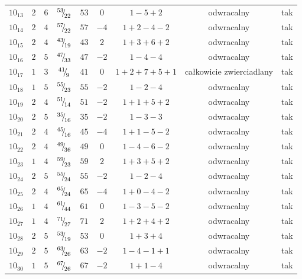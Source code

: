 \begin{longtable}{ccccccccc}
$10_{13}$ & $2$ & $6$ & ${}^{53}{\mskip -5mu/\mskip -3mu}_{22}$ & $53$ & $0$ & $1-5+2$ & odwracalny & tak \\
$10_{14}$ & $2$ & $4$ & ${}^{57}{\mskip -5mu/\mskip -3mu}_{22}$ & $57$ & $-4$ & $1+2-4-2$ & odwracalny & tak \\
$10_{15}$ & $2$ & $4$ & ${}^{43}{\mskip -5mu/\mskip -3mu}_{19}$ & $43$ & $2$ & $1+3+6+2$ & odwracalny & tak \\
$10_{16}$ & $2$ & $5$ & ${}^{47}{\mskip -5mu/\mskip -3mu}_{33}$ & $47$ & $-2$ & $1-4-4$ & odwracalny & tak \\
$10_{17}$ & $1$ & $3$ & ${}^{41}{\mskip -5mu/\mskip -3mu}_{9}$ & $41$ & $0$ & $1+2+7+5+1$ & całkowicie zwierciadlany & tak \\
$10_{18}$ & $1$ & $5$ & ${}^{55}{\mskip -5mu/\mskip -3mu}_{23}$ & $55$ & $-2$ & $1-2-4$ & odwracalny & tak \\
$10_{19}$ & $2$ & $4$ & ${}^{51}{\mskip -5mu/\mskip -3mu}_{14}$ & $51$ & $-2$ & $1+1+5+2$ & odwracalny & tak \\
$10_{20}$ & $2$ & $5$ & ${}^{35}{\mskip -5mu/\mskip -3mu}_{16}$ & $35$ & $-2$ & $1-3-3$ & odwracalny & tak \\
$10_{21}$ & $2$ & $4$ & ${}^{45}{\mskip -5mu/\mskip -3mu}_{16}$ & $45$ & $-4$ & $1+1-5-2$ & odwracalny & tak \\
$10_{22}$ & $2$ & $4$ & ${}^{49}{\mskip -5mu/\mskip -3mu}_{36}$ & $49$ & $0$ & $1-4-6-2$ & odwracalny & tak \\
$10_{23}$ & $1$ & $4$ & ${}^{59}{\mskip -5mu/\mskip -3mu}_{23}$ & $59$ & $2$ & $1+3+5+2$ & odwracalny & tak \\
$10_{24}$ & $2$ & $5$ & ${}^{55}{\mskip -5mu/\mskip -3mu}_{24}$ & $55$ & $-2$ & $1-2-4$ & odwracalny & tak \\
$10_{25}$ & $2$ & $4$ & ${}^{65}{\mskip -5mu/\mskip -3mu}_{24}$ & $65$ & $-4$ & $1+0-4-2$ & odwracalny & tak \\
$10_{26}$ & $1$ & $4$ & ${}^{61}{\mskip -5mu/\mskip -3mu}_{44}$ & $61$ & $0$ & $1-3-5-2$ & odwracalny & tak \\
$10_{27}$ & $1$ & $4$ & ${}^{71}{\mskip -5mu/\mskip -3mu}_{27}$ & $71$ & $2$ & $1+2+4+2$ & odwracalny & tak \\
$10_{28}$ & $2$ & $5$ & ${}^{53}{\mskip -5mu/\mskip -3mu}_{19}$ & $53$ & $0$ & $1+3+4$ & odwracalny & tak \\
$10_{29}$ & $2$ & $5$ & ${}^{63}{\mskip -5mu/\mskip -3mu}_{26}$ & $63$ & $-2$ & $1-4-1+1$ & odwracalny & tak \\
$10_{30}$ & $1$ & $5$ & ${}^{67}{\mskip -5mu/\mskip -3mu}_{26}$ & $67$ & $-2$ & $1+1-4$ & odwracalny & tak \\

\end{longtable}
